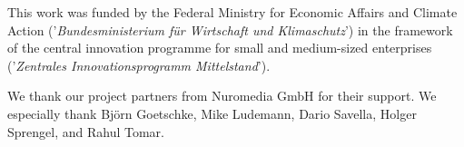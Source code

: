 \documentclass[runningheads]{llncs}
\begin{document}
This work was funded by the Federal Ministry for Economic Affairs and Climate Action
('\textsl{Bundesministerium f\"ur Wirtschaft und Klimaschutz}')
in the framework of the central innovation programme
for small and medium-sized enterprises
('\textsl{Zentrales Innovationsprogramm Mittelstand}').

We thank our project partners from Nuromedia GmbH for their support.
We especially thank Björn Goetschke, Mike Ludemann, Dario Savella, Holger Sprengel, and Rahul Tomar.



%
%


%

\end{document}
